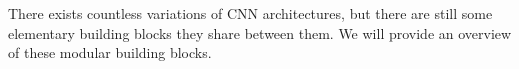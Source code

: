There exists countless variations of CNN architectures, but there are still some elementary building blocks they share between them.
We will provide an overview of these modular building blocks.
